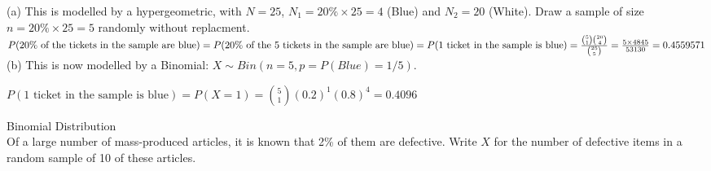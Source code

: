 \documentclass[bigtut]{tutorial}\usepackage[]{graphicx}\usepackage[]{color}
\begin{document}
\begin{tutorial}
\begin{questions}


\begin{solution}
(a) 
This is modelled by a hypergeometric, with $N=25$, $N_{1} = 20 \% \times 25 = 4$ (Blue) and $N_{2} = 20$ (White). Draw a sample of size $n= 20 \% \times 25 = 5$ randomly without replacment. \\

$P( \text{20\% of the tickets in the sample are blue}) \\ = P( \text{20\% of the 5 tickets in the sample are blue} )  \\
= P( \text{1 ticket in the sample is blue} )  \\
= \frac{ {5 \choose 1 }  {20 \choose 4}   }{ {25 \choose 5} } \\
\vspace{.2cm}
= \frac{5 \times 4845}{53130} \\
= 0.4559571 $ \\

(b) This is now modelled by a Binomial: $X \sim Bin(n=5, p=P(Blue)=1/5)$.

$P( \text{1 ticket in the sample is blue} ) = P(X=1) = {5 \choose 1} (0.2)^1 (0.8)^4 = 0.4096$
\end{solution}


\question Binomial Distribution \\

Of a large number of mass-produced articles, it is known that 2\% of them
are defective.  Write $X$ for the number of defective
items in a random sample of 10 of these articles.  \\

\end{questions}
\end{tutorial}
\end{document}
